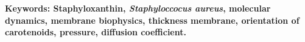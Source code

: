\textbf{\small Keywords: Staphyloxanthin, \textit{Staphyloccocus aureus}, molecular dynamics, membrane biophysics, thickness membrane, orientation of carotenoids, pressure, diffusion coefficient.}\\ \\[2.0cm]


